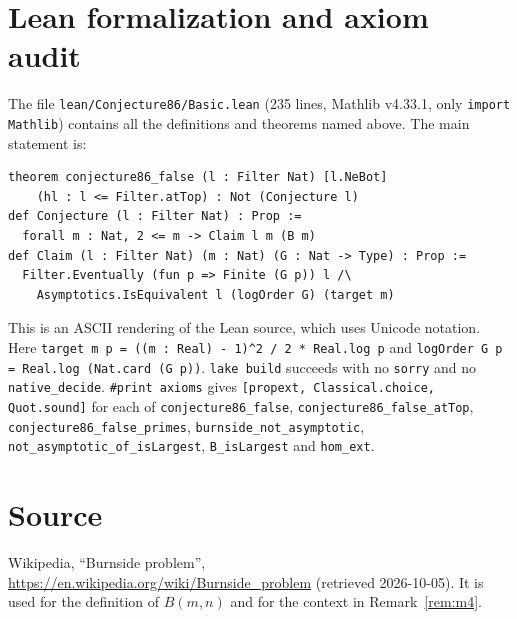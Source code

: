\documentclass[11pt]{article}
\theoremstyle{definition}
\theoremstyle{remark}
\begin{document}
\section{Lean formalization and axiom audit}

The file \texttt{lean/Conjecture86/Basic.lean} (235 lines, Mathlib v4.33.1, only
\texttt{import Mathlib}) contains all the definitions and theorems named above. The main
statement is:
\begin{verbatim}
theorem conjecture86_false (l : Filter Nat) [l.NeBot]
    (hl : l <= Filter.atTop) : Not (Conjecture l)
def Conjecture (l : Filter Nat) : Prop :=
  forall m : Nat, 2 <= m -> Claim l m (B m)
def Claim (l : Filter Nat) (m : Nat) (G : Nat -> Type) : Prop :=
  Filter.Eventually (fun p => Finite (G p)) l /\
    Asymptotics.IsEquivalent l (logOrder G) (target m)
\end{verbatim}
This is an ASCII rendering of the Lean source, which uses Unicode notation. Here
\texttt{target m p = ((m : Real) - 1)\^{}2 / 2 * Real.log p} and
\texttt{logOrder G p = Real.log (Nat.card (G p))}. \texttt{lake build} succeeds with no
\texttt{sorry} and no \texttt{native\_decide}. \texttt{\#print axioms} gives
\texttt{[propext, Classical.choice, Quot.sound]} for each of \texttt{conjecture86\_false},
\texttt{conjecture86\_false\_atTop}, \texttt{conjecture86\_false\_primes},
\texttt{burnside\_not\_asymptotic}, \texttt{not\_asymptotic\_of\_isLargest},
\texttt{B\_isLargest} and \texttt{hom\_ext}.

\section*{Source}
Wikipedia, ``Burnside problem'', \url{https://en.wikipedia.org/wiki/Burnside_problem} (retrieved
2026-10-05). It is used for the definition of $B(m,n)$ and for the context in
Remark~\ref{rem:m4}.
\end{document}
